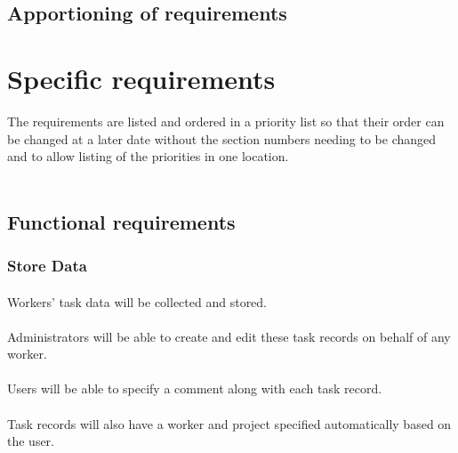 \documentclass[12pt]{article}
\begin{document}
\subsection{Apportioning of requirements}

\section{Specific requirements}
The requirements are listed and ordered in a priority list so that their order can be changed at a later date without the section numbers needing to be changed and to allow listing of the priorities in one location.\\
\\

\begin{comment}
The first 2 are to be considered absolutely critical. The software cannot be considered useful if those features are absent.

What are the security implications of storing identifiable time sheet info for employees??
\end{comment}

\subsection{Functional requirements}
 
\subsubsection{Store Data}\label{sec:Store Data}
\paragraph{} Workers' task data will be collected and stored.
\paragraph{} Administrators will be able to create and edit these task records on behalf of any worker.
\paragraph{} Users will be able to specify a comment along with each task record.
\paragraph{} Task records will also have a worker and project specified automatically based on the user.
\end{document}
